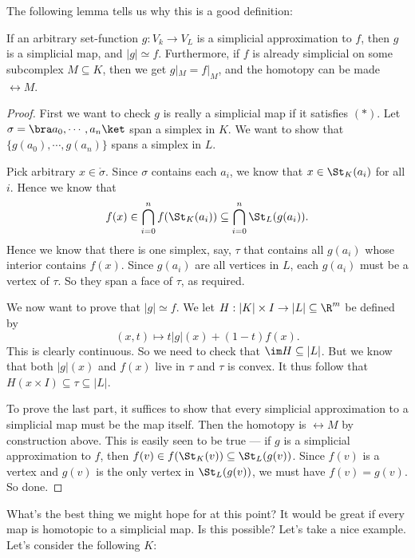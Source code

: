 \documentclass[a4paper]{article}
\begin{document}
The following lemma tells us why this is a good definition:
\begin{lemma}
  If an arbitrary set-function $g: V_k \to V_L$ is a simplicial approximation to $f$, then $g$ is a simplicial map, and $|g| \simeq f$. Furthermore, if $f$ is already simplicial on some subcomplex $M\subseteq K$, then we get $g|_M = f|_M$, and the homotopy can be made $\rel M$.
\end{lemma}

\begin{proof}
  First we want to check $g$ is really a simplicial map if it satisfies $(*)$. Let $\sigma = \bra a_0,\cdots, a_n\ket$ span a simplex in $K$. We want to show that $\{g(a_0), \cdots, g(a_n)\}$ spans a simplex in $L$.

  Pick arbitrary $x \in \mathring{\sigma}$. Since $\sigma$ contains each $a_i$, we know that $x \in \St_K(a_i)$ for all $i$. Hence we know that
  \[
    f(x) \in \bigcap_{i = 0}^n f(\St_K(a_i)) \subseteq \bigcap_{i = 0}^n \St_L(g(a_i)).
  \]
  Hence we know that there is one simplex, say, $\tau$ that contains all $g(a_i)$ whose interior contains $f(x)$. Since $g(a_i)$ are all vertices in $L$, each $g(a_i)$ must be a vertex of $\tau$. So they span a face of $\tau$, as required.

  We now want to prove that $|g| \simeq f$. We let $H: |K| \times I \to |L| \subseteq \R^m$ be defined by
  \[
    (x, t) \mapsto t |g|(x) + (1 - t)f(x).
  \]
  This is clearly continuous. So we need to check that $\im H \subseteq |L|$. But we know that both $|g|(x)$ and $f(x)$ live in $\tau$ and $\tau$ is convex. It thus follow that $H(x \times I) \subseteq \tau \subseteq |L|$.

  To prove the last part, it suffices to show that every simplicial approximation to a simplicial map must be the map itself. Then the homotopy is $\rel M$ by construction above. This is easily seen to be true --- if $g$ is a simplicial approximation to $f$, then $f(v) \in f(\St_K(v)) \subseteq \St_L(g(v))$. Since $f(v)$ is a vertex and $g(v)$ is the only vertex in $\St_L(g(v))$, we must have $f(v) = g(v)$. So done.
\end{proof}
What's the best thing we might hope for at this point? It would be great if every map is homotopic to a simplicial map. Is this possible? Let's take a nice example. Let's consider the following $K$:
\begin{center}
\end{center}
\end{document}
